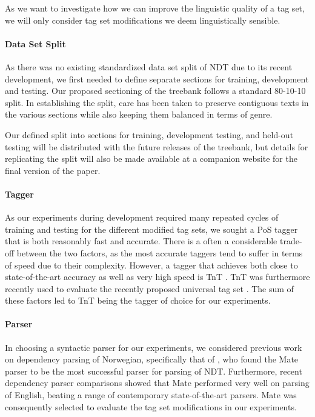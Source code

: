 \documentclass[11pt,a4paper]{article}
\begin{document}
As we want to investigate how we can improve the linguistic quality of a tag
set, we will only consider tag set modifications we deem linguistically
sensible.

\paragraph{Data Set Split}
As there was no existing standardized data set split of NDT due to its recent
development, we first needed to define separate sections for training, development and
testing. Our proposed sectioning of the treebank follows a 
standard 80-10-10 split. In establishing the  
split, care has been taken to preserve contiguous texts in the various 
sections while also keeping them balanced in terms of genre. 

Our defined split into sections for training, development testing, and held-out
testing will be distributed with the future releases of the treebank, but 
details for replicating the split will also be made available at a companion website
for the final version of the paper. 

\paragraph{Tagger}
As our experiments during development required many repeated cycles of training and
testing for the different modified tag sets, we sought a PoS tagger that is both
reasonably fast and accurate. There is a often a considerable trade-off between
the two factors, as the most accurate taggers tend to suffer in terms of speed
due to their complexity. However, a tagger that achieves both close to
state-of-the-art accuracy as well as very high speed is TnT \cite{Bra:00}. TnT
was furthermore recently used to evaluate the recently proposed universal tag
set \cite{Pet:Das:McD:12}. The sum of these factors led to TnT being the tagger
of choice for our experiments.

\paragraph{Parser}
In choosing a syntactic parser for our experiments, we considered previous work
on dependency parsing of Norwegian, specifically that of
, who found the Mate parser \cite{Boh:10} to be the
most successful parser for parsing of NDT. Furthermore, recent dependency
parser comparisons \cite{Cho:Tet:Ste:15} showed that Mate performed very well
on parsing of English, beating a range of contemporary state-of-the-art
parsers. Mate was consequently selected to evaluate the tag set modifications in
our experiments.
\end{document}

